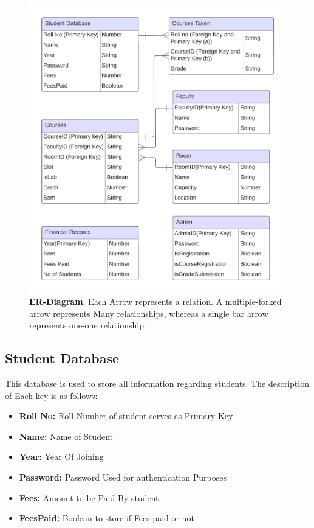 \documentclass[12pt,a4paper]{article}
\begin{document}
\begin{figure}[H]
    \centering
        \includegraphics[scale=1.2]{ERDiagram.png} 
    \caption{\textbf{ER-Diagram}, Each Arrow represents a relation. A multiple-forked arrow represents Many relationships, whereas a single bar arrow represents one-one relationship.}
\end{figure}
    
    \subsection{Student Database}
        This database is used to store all information regarding students. The description of Each key is as follows:
        \begin{itemize}
        \item \textbf{Roll No:} Roll Number of student serves as Primary Key
        \item  \textbf{Name:} Name of Student
        \item  \textbf{Year:} Year Of Joining
        \item  \textbf{Password:} Password Used for authentication Purposes
        \item  \textbf{Fees:} Amount to be Paid By student
        \item  \textbf{FeesPaid:} Boolean to store if Fees paid or not
    \end{itemize}
\end{document}
